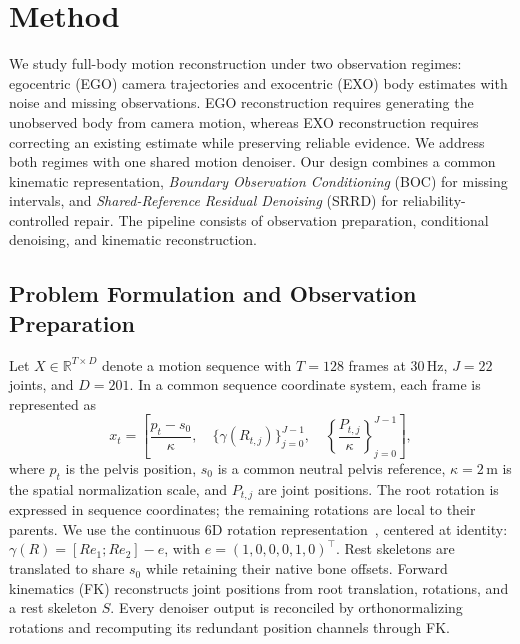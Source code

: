 \section{Method}
\label{sec:method}

We study full-body motion reconstruction under two observation regimes: egocentric (EGO) camera trajectories and exocentric (EXO) body estimates with noise and missing observations. EGO reconstruction requires generating the unobserved body from camera motion, whereas EXO reconstruction requires correcting an existing estimate while preserving reliable evidence. We address both regimes with one shared motion denoiser. Our design combines a common kinematic representation, \emph{Boundary Observation Conditioning} (BOC) for missing intervals, and \emph{Shared-Reference Residual Denoising} (SRRD) for reliability-controlled repair. The pipeline consists of observation preparation, conditional denoising, and kinematic reconstruction.

\subsection{Problem Formulation and Observation Preparation}
\label{sec:observations}

Let $X\in\mathbb{R}^{T\times D}$ denote a motion sequence with $T=128$ frames at 30\,Hz, $J=22$ joints, and $D=201$. In a common sequence coordinate system, each frame is represented as
\begin{equation}
x_t=\left[
  \frac{p_t-s_0}{\kappa},\quad
  \{\gamma(R_{t,j})\}_{j=0}^{J-1},\quad
  \left\{\frac{P_{t,j}}{\kappa}\right\}_{j=0}^{J-1}
\right],
\label{eq:representation}
\end{equation}
where $p_t$ is the pelvis position, $s_0$ is a common neutral pelvis reference, $\kappa=2\,\mathrm{m}$ is the spatial normalization scale, and $P_{t,j}$ are joint positions. The root rotation is expressed in sequence coordinates; the remaining rotations are local to their parents. We use the continuous 6D rotation representation~\cite{zhou2019continuity}, centered at identity: $\gamma(R)=[Re_1;Re_2]-e$, with $e=(1,0,0,0,1,0)^\top$. Rest skeletons are translated to share $s_0$ while retaining their native bone offsets. Forward kinematics (FK) reconstructs joint positions from root translation, rotations, and a rest skeleton $S$. Every denoiser output is reconciled by orthonormalizing rotations and recomputing its redundant position channels through FK.

